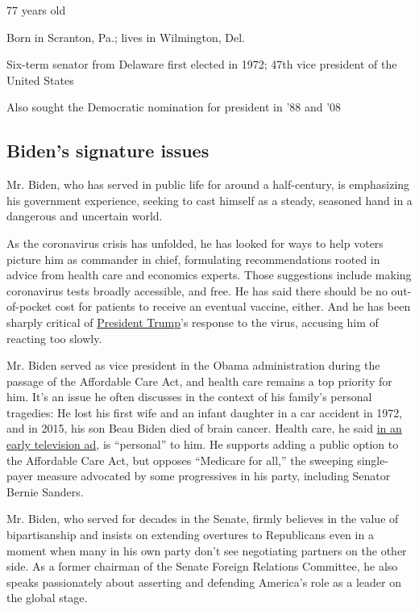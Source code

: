 77 years old

Born in Scranton, Pa.; lives in Wilmington, Del.

Six-term senator from Delaware first elected in 1972; 47th vice
president of the United States

Also sought the Democratic nomination for president in '88 and '08

\hypertarget{bidens-signature-issues}{%
\subsection{Biden's signature issues}\label{bidens-signature-issues}}

Mr. Biden, who has served in public life for around a half-century, is
emphasizing his government experience, seeking to cast himself as a
steady, seasoned hand in a dangerous and uncertain world.

As the coronavirus crisis has unfolded, he has looked for ways to help
voters picture him as commander in chief, formulating recommendations
rooted in advice from health care and economics experts. Those
suggestions include making coronavirus tests broadly accessible, and
free. He has said there should be no out-of-pocket cost for patients to
receive an eventual vaccine, either. And he has been sharply critical of
\href{https://www.nytimes3xbfgragh.onion/interactive/2020/us/elections/donald-trump.html}{President
Trump}'s response to the virus, accusing him of reacting too slowly.

Mr. Biden served as vice president in the Obama administration during
the passage of the Affordable Care Act, and health care remains a top
priority for him. It's an issue he often discusses in the context of his
family's personal tragedies: He lost his first wife and an infant
daughter in a car accident in 1972, and in 2015, his son Beau Biden died
of brain cancer. Health care, he said
\href{https://www.nytimes3xbfgragh.onion/2019/08/27/us/politics/joe-biden-ad-personal.html}{in
an early television ad}, is ``personal'' to him. He supports adding a
public option to the Affordable Care Act, but opposes ``Medicare for
all,'' the sweeping single-payer measure advocated by some progressives
in his party, including Senator Bernie Sanders.

Mr. Biden, who served for decades in the Senate, firmly believes in the
value of bipartisanship and insists on extending overtures to
Republicans even in a moment when many in his own party don't see
negotiating partners on the other side. As a former chairman of the
Senate Foreign Relations Committee, he also speaks passionately about
asserting and defending America's role as a leader on the global stage.

